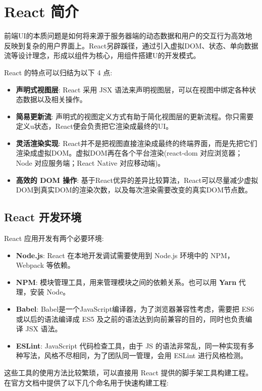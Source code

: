 \section{React 简介}

前端UI的本质问题是如何将来源于服务器端的动态数据和用户的交互行为高效地反映到复杂的用户界面上。React另辟蹊径，通过引入虚拟DOM、状态、单向数据流等设计理念，形成以组件为核心，用组件搭建U的开发模式。

React 的特点可以归结为以下 4 点:
\begin{itemize}
    \item \textbf{声明式视图层}: React 采用 JSX 语法来声明视图层，可以在视图中绑定各种状态数据以及相关操作。
    \item \textbf{简易更新流}: 声明式的视图定义方式有助于简化视图层的更新流程。你只需要定义u状态，React便会负责把它渲染成最终的UI。
    \item \textbf{灵活渲染实现}: React并不是把视图直接渲染成最终的终端界面，而是先把它们渲染成虚拟DOM。虚拟DOM再在各个平台渲染(react-dom 对应浏览器；Node 对应服务端；React Native 对应移动端)。
    \item \textbf{高效的 DOM 操作}: 基于React优异的差异比较算法，React可以尽量减少虚拟DOM到真实DOM的渲染次数，以及每次渲染需要改变的真实DOM节点数。
\end{itemize}

\subsection{React 开发环境}

React 应用开发有两个必要环境:
\begin{itemize}
    \item \textbf{Node.js}: React 在本地开发调试需要使用到 Node.js 环境中的 NPM，Webpack 等依赖。
    \item \textbf{NPM}: 模块管理工具，用来管理模块之间的依赖关系。也可以用 \textbf{Yarn} 代理，安装 Node。
    \item \textbf{Babel}: Babel是一个JavaScript编译器，为了浏览器兼容性考虑，需要把 ES6 或以后的语法编译成 ES5 及之前的语法达到向前兼容的目的，同时也负责编译 JSX 语法。
    \item \textbf{ESLint}: JavaScript 代码检查工具，由于 JS 的语法非常乱，同一种实现有多种写法，风格不尽相同，为了团队同一管理，会用 ESLint 进行风格检测。
\end{itemize}

这些工具的使用方法比较繁琐，可以直接用 React 提供的脚手架工具构建工程。在官方文档中提供了以下几个命名用于快速构建工程:

